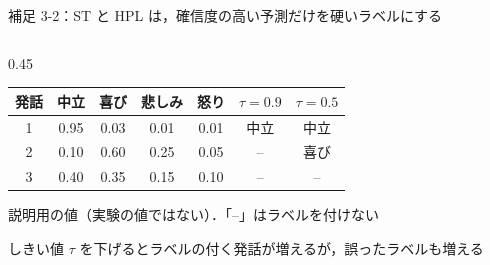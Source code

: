 \begin{frame}{補足 3-2：ST と HPL は，確信度の高い予測だけを硬いラベルにする}
\begin{columns}[T,onlytextwidth]
\begin{column}{0.45\textwidth}
\begin{tabular}{@{}c cccc cc@{}}
        発話 & 中立 & 喜び & 悲しみ & 怒り & $\tau = 0.9$ & $\tau = 0.5$ \\
        \midrule
        1 & 0.95 & 0.03 & 0.01 & 0.01 & 中立 & 中立 \\
        2 & 0.10 & 0.60 & 0.25 & 0.05 & -- & 喜び \\
        3 & 0.40 & 0.35 & 0.15 & 0.10 & -- & -- \\
        \bottomrule
      \end{tabular}\par
      \vspace{0.2em}
      {\tiny 説明用の値（実験の値ではない）．「--」はラベルを付けない\par}
      \vspace{0.4em}
      {\raggedright\scriptsize しきい値 $\tau$ を下げるとラベルの付く発話が増えるが，誤ったラベルも増える\par}
    \end{column}
  \end{columns}
\end{frame}

